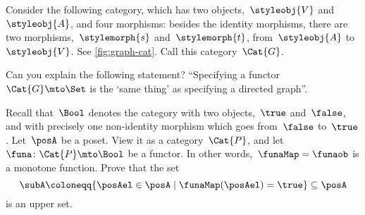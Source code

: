 \begin{gradedexercise}\label{ex:GraphsViaFunctors}
Consider the following category, which has two objects,~$\styleobj{V}$ and~$\styleobj{A}$, and four morphisms:
besides the identity morphisms, there are two morphisms,~$\stylemorph{s}$ and~$\stylemorph{t}$, from~$\styleobj{A}$ to~$\styleobj{V}$.
See \cref{fig:graph-cat}. Call this category~$\Cat{G}$.

Can you explain the following statement? ``Specifying a functor~$\Cat{G} \mto \Set$ is the `same thing' as specifying a directed graph''.
\end{gradedexercise}


\begin{marginfigure}
\begin{center}
\end{center}
\caption{}
  \label{fig:graph-cat}
\end{marginfigure}

\begin{gradedexercise}\label{ex:UpperSetsViaFunctors}
Recall that~$\Bool$ denotes the category with two objects,~$\true$ and~$\false$, and with precisely one non-identity morphism which goes from~$\false$ to~$\true$.
Let~$\posA$ be a poset. View it as a category~$\Cat{P}$, and let~$\funa \colon \Cat{P} \mto \Bool$ be a functor. In other words,~$\funaMap = \funaob$ is a monotone function.
Prove that the set
\begin{equation}
\subA \coloneqq \{ \posAel \in \posA \mid \funaMap(\posAel) = \true \} \subseteq \posA
\end{equation}
is an upper set.
\end{gradedexercise}

